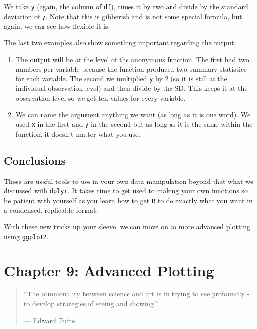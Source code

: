 \documentclass[]{tufte-book}
\providecommand{\tightlist}{%
  \setlength{\itemsep}{0pt}\setlength{\parskip}{0pt}}
\theoremstyle{definition}
\theoremstyle{definition}
\theoremstyle{remark}
\begin{document}
We take \texttt{y} (again, the column of \texttt{df}), times it by two
and divide by the standard deviation of \texttt{y}. Note that this is
gibberish and is not some special formula, but again, we can see how
flexible it is.

The last two examples also show something important regarding the
output:

\begin{enumerate}
\def\labelenumi{\arabic{enumi}.}
\tightlist
\item
  The output will be at the level of the anonymous function. The first
  had two numbers per variable because the function produced two summary
  statistics for each variable. The second we multiplied \texttt{y} by 2
  (so it is still at the individual observation level) and then divide
  by the SD. This keeps it at the observation level so we get ten values
  for every variable.
\item
  We can name the argument anything we want (as long as it is one word).
  We used \texttt{x} in the first and \texttt{y} in the second but as
  long as it is the same within the function, it doesn't matter what you
  use.
\end{enumerate}

\section*{Conclusions}\label{conclusions-4}

These are useful tools to use in your own data manipulation beyond that
what we discussed with \texttt{dplyr}. It takes time to get used to
making your own functions so be patient with yourself as you learn how
to get \texttt{R} to do exactly what you want in a condensed, replicable
format.

With these new tricks up your sleeve, we can move on to more advanced
plotting using \texttt{ggplot2}.

\chapter*{Chapter 9: Advanced
Plotting}\label{chapter-9-advanced-plotting}

\begin{quote}
``The commonality between science and art is in trying to see profoundly
- to develop strategies of seeing and showing.''

--- Edward Tufte
\end{quote}
\end{document}
